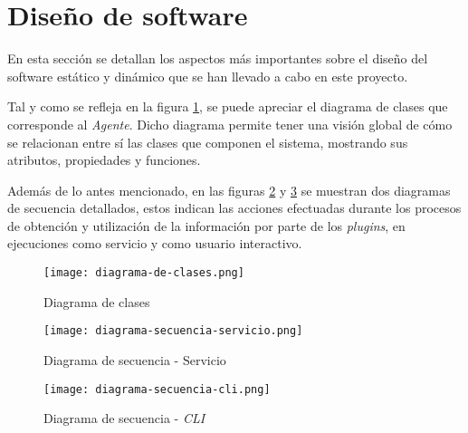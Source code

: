 \section{Diseño de software} \label{sec:dis}

    En esta sección se detallan los aspectos más importantes sobre el diseño del software estático y dinámico que se han llevado a cabo en este proyecto.
    
    Tal y como se refleja en la figura \ref{fig:class-diagram}, se puede apreciar el diagrama de clases que corresponde al \textit{Agente}. Dicho diagrama permite tener una visión global de cómo se relacionan entre sí las clases que componen el sistema, mostrando sus atributos, propiedades y funciones.
    
    Además de lo antes mencionado, en las figuras \ref{fig:sequence-diagram-service} y \ref{fig:sequence-diagram-cli} se muestran dos diagramas de secuencia detallados, estos indican las acciones efectuadas durante los procesos de obtención y utilización de la información por parte de los \textit{plugins}, en ejecuciones como servicio y como usuario interactivo.

    \begin{figure}[h!]
    \centering
        \texttt{[image: diagrama-de-clases.png]}
        \caption{Diagrama de clases}
        \label{fig:class-diagram}
    \end{figure}

    \begin{figure}[h!]
    \centering
        \texttt{[image: diagrama-secuencia-servicio.png]}
        \caption{Diagrama de secuencia - Servicio}
        \label{fig:sequence-diagram-service}
    \end{figure}
    
    \begin{figure}[h!]
    \centering
        \texttt{[image: diagrama-secuencia-cli.png]}
        \caption{Diagrama de secuencia - \textit{CLI}}
        \label{fig:sequence-diagram-cli}
    \end{figure}
    
